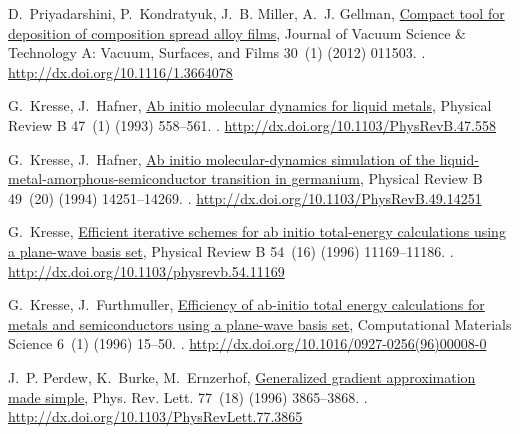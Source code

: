 \documentclass[number, sort&compress, review, 12pt]{elsarticle}
\begin{document}
\begin{thebibliography}{10}
D.~Priyadarshini, P.~Kondratyuk, J.~B. Miller, A.~J. Gellman,
  \href{http://dx.doi.org/10.1116/1.3664078}{Compact tool for deposition of
  composition spread alloy films}, Journal of Vacuum Science \& Technology A:
  Vacuum, Surfaces, and Films 30~(1) (2012) 011503.
\newblock \href {http://dx.doi.org/10.1116/1.3664078}
  {}.
\newline\urlprefix\url{http://dx.doi.org/10.1116/1.3664078}

G.~Kresse, J.~Hafner, \href{http://dx.doi.org/10.1103/PhysRevB.47.558}{Ab
  initio molecular dynamics for liquid metals}, Physical Review B 47~(1) (1993)
  558--561.
\newblock \href {http://dx.doi.org/10.1103/physrevb.47.558}
  {}.
\newline\urlprefix\url{http://dx.doi.org/10.1103/PhysRevB.47.558}

G.~Kresse, J.~Hafner, \href{http://dx.doi.org/10.1103/PhysRevB.49.14251}{Ab
  initio molecular-dynamics simulation of the
  liquid-metal-amorphous-semiconductor transition in germanium}, Physical
  Review B 49~(20) (1994) 14251--14269.
\newblock \href {http://dx.doi.org/10.1103/physrevb.49.14251}
  {}.
\newline\urlprefix\url{http://dx.doi.org/10.1103/PhysRevB.49.14251}

G.~Kresse, \href{http://dx.doi.org/10.1103/physrevb.54.11169}{Efficient
  iterative schemes for ab initio total-energy calculations using a plane-wave
  basis set}, Physical Review B 54~(16) (1996) 11169--11186.
\newblock \href {http://dx.doi.org/10.1103/physrevb.54.11169}
  {}.
\newline\urlprefix\url{http://dx.doi.org/10.1103/physrevb.54.11169}

G.~Kresse, J.~Furthm\:uller,
  \href{http://dx.doi.org/10.1016/0927-0256(96)00008-0}{Efficiency of ab-initio
  total energy calculations for metals and semiconductors using a plane-wave
  basis set}, Computational Materials Science 6~(1) (1996) 15--50.
\newblock \href {http://dx.doi.org/10.1016/0927-0256(96)00008-0}
  {}.
\newline\urlprefix\url{http://dx.doi.org/10.1016/0927-0256(96)00008-0}

J.~P. Perdew, K.~Burke, M.~Ernzerhof,
  \href{http://dx.doi.org/10.1103/PhysRevLett.77.3865}{Generalized gradient
  approximation made simple}, Phys. Rev. Lett. 77~(18) (1996) 3865--3868.
\newblock \href {http://dx.doi.org/10.1103/physrevlett.77.3865}
  {}.
\newline\urlprefix\url{http://dx.doi.org/10.1103/PhysRevLett.77.3865}


\end{thebibliography}
\end{document}
